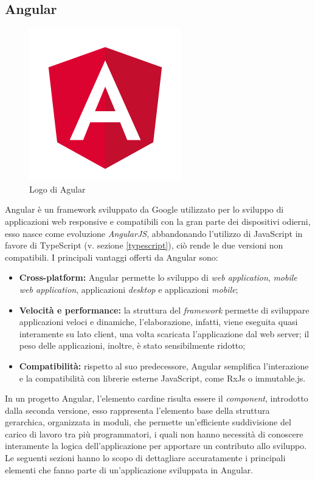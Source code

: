 \subsection{Angular}
\begin{figure}[!h] 
	\centering 
	\includegraphics[width=0.3\columnwidth]{immagini/angular.png} 
	\caption{Logo di Agular}
	\label{figura:angular-1}
\end{figure}
Angular è un framework sviluppato da Google utilizzato per lo sviluppo di applicazioni web responsive e compatibili con la gran parte dei dispositivi odierni, esso nasce come evoluzione \textit{AngularJS}, abbandonando l'utilizzo di JavaScript in favore di TypeScript (v. sezione \ref{typescript}), ciò rende le due versioni non compatibili.
I principali vantaggi offerti da Angular sono:
\begin{itemize}
	\item \textbf{Cross-platform:} Angular permette lo sviluppo di \textit{web application}, \textit{mobile web application}, applicazioni \textit{desktop} e applicazioni \textit{mobile};
	\item \textbf{Velocità e performance:} la struttura del \textit{framework} permette di sviluppare applicazioni veloci e dinamiche, l'elaborazione, infatti, viene eseguita quasi interamente su lato client, una volta scaricata l'applicazione dal \gls{web server}; il peso delle applicazioni, inoltre, è stato sensibilmente ridotto;
	\item \textbf{Compatibilità:} rispetto al suo predecessore, Angular semplifica l'interazione e la compatibilità con librerie esterne JavaScript, come \gls{RxJs} o \gls{immutable.js}.
\end{itemize}

In un progetto Angular, l'elemento cardine risulta essere il \textit{component}, introdotto dalla seconda versione, esso rappresenta l'elemento base della struttura gerarchica, organizzata in moduli, che permette un'efficiente suddivisione del carico di lavoro tra più programmatori, i quali non hanno necessità di conoscere interamente la logica dell'applicazione per apportare un contributo allo sviluppo.
Le seguenti sezioni hanno lo scopo di dettagliare accuratamente i principali elementi che fanno parte di un'applicazione sviluppata in Angular.


